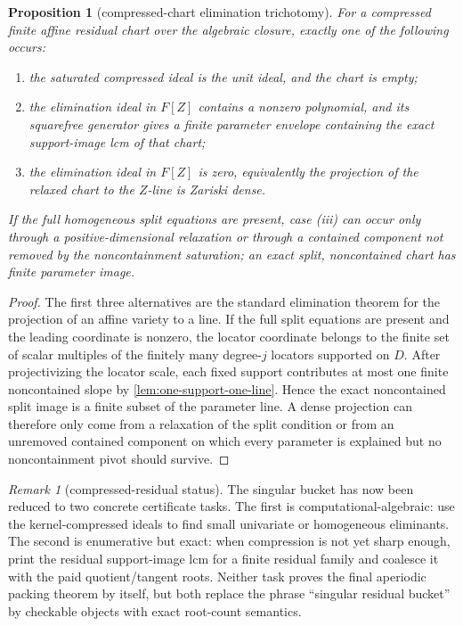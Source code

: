 \documentclass[11pt]{article}
\newtheorem{proposition}[theorem]{Proposition}
\theoremstyle{definition}
\theoremstyle{remark}
\newtheorem{remark}[theorem]{Remark}
\begin{document}
\begin{proposition}[compressed-chart elimination trichotomy]
\label{prop:compressed-chart-elimination-trichotomy}
For a compressed finite affine residual chart over the algebraic closure, exactly
one of the following occurs:
\begin{enumerate}[label=\textup{(\roman*)},leftmargin=2.2em]
\item the saturated compressed ideal is the unit ideal, and the chart is empty;
\item the elimination ideal in $F[Z]$ contains a nonzero polynomial, and its
squarefree generator gives a finite parameter envelope containing the exact
support-image lcm of that chart;
\item the elimination ideal in $F[Z]$ is zero, equivalently the projection of the
relaxed chart to the $Z$-line is Zariski dense.
\end{enumerate}
If the full homogeneous split equations are present, case \textup{(iii)} can occur
only through a positive-dimensional relaxation or through a contained component
not removed by the noncontainment saturation; an exact split, noncontained chart
has finite parameter image.
\end{proposition}

\begin{proof}
The first three alternatives are the standard elimination theorem for the
projection of an affine variety to a line.  If the full split equations are
present and the leading coordinate is nonzero, the locator coordinate belongs to
the finite set of scalar multiples of the finitely many degree-$j$ locators
supported on $D$.  After projectivizing the locator scale, each fixed support
contributes at most one finite noncontained slope by
\cref{lem:one-support-one-line}.  Hence the exact noncontained split image is a
finite subset of the parameter line.  A dense projection can therefore only come
from a relaxation of the split condition or from an unremoved contained component
on which every parameter is explained but no noncontainment pivot should survive.
\end{proof}

\begin{remark}[compressed-residual status]
The singular bucket has now been reduced to two concrete certificate tasks.  The
first is computational-algebraic: use the kernel-compressed ideals to find small
univariate or homogeneous eliminants.  The second is enumerative but exact: when
compression is not yet sharp enough, print the residual support-image lcm for a
finite residual family and coalesce it with the paid quotient/tangent roots.
Neither task proves the final aperiodic packing theorem by itself, but both
replace the phrase ``singular residual bucket'' by checkable objects with exact
root-count semantics.
\end{remark}
\end{document}
